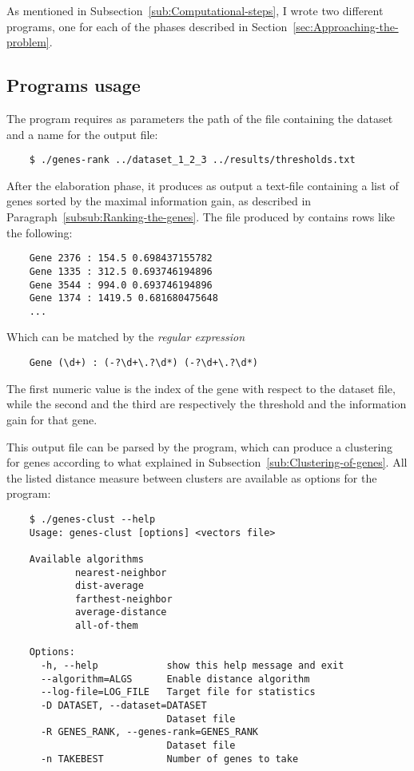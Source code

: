 As mentioned in Subsection~\ref{sub:Computational-steps}, I wrote two
different programs, one for each of the phases described in
Section~\ref{sec:Approaching-the-problem}.

\subsection{ Programs usage }

    The program  requires as parameters the path
    of the file containing the dataset and a name for the output file:
    \begin{verbatim}
    $ ./genes-rank ../dataset_1_2_3 ../results/thresholds.txt
    \end{verbatim}

    After the elaboration phase, it produces as output a text-file
    containing a list of genes sorted by the maximal information gain, as
    described in Paragraph~\ref{subsub:Ranking-the-genes}. The file
    produced by  contains rows like the following:
    \begin{verbatim}
    Gene 2376 : 154.5 0.698437155782
    Gene 1335 : 312.5 0.693746194896
    Gene 3544 : 994.0 0.693746194896
    Gene 1374 : 1419.5 0.681680475648
    ...
    \end{verbatim}

    Which can be matched by the \emph{regular expression}
    \begin{verbatim}
    Gene (\d+) : (-?\d+\.?\d*) (-?\d+\.?\d*)
    \end{verbatim}

    The first numeric value is the index of the gene with respect to the
    dataset file, while the second and the third are respectively the
    threshold and the information gain for that gene.

    This output file can be parsed by the  program,
    which can produce a clustering for genes according to what explained
    in Subsection~\ref{sub:Clustering-of-genes}. All the listed distance
    measure between clusters are available as options for the program:
    \begin{verbatim}
    $ ./genes-clust --help
    Usage: genes-clust [options] <vectors file>

    Available algorithms
            nearest-neighbor
            dist-average
            farthest-neighbor
            average-distance
            all-of-them

    Options:
      -h, --help            show this help message and exit
      --algorithm=ALGS      Enable distance algorithm
      --log-file=LOG_FILE   Target file for statistics
      -D DATASET, --dataset=DATASET
                            Dataset file
      -R GENES_RANK, --genes-rank=GENES_RANK
                            Dataset file
      -n TAKEBEST           Number of genes to take
    \end{verbatim}

